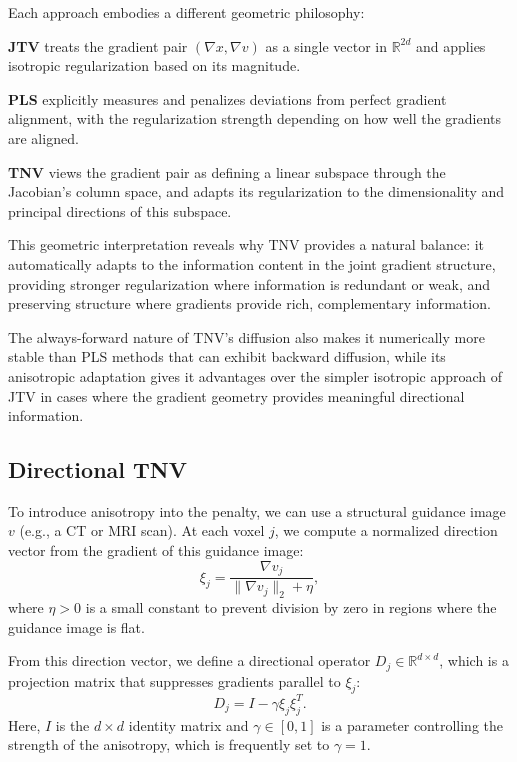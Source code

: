 Each approach embodies a different geometric philosophy:

\textbf{JTV} treats the gradient pair $(\nabla x, \nabla v)$ as a single vector in $\mathbb{R}^{2d}$ and applies isotropic regularization based on its magnitude.

\textbf{PLS} explicitly measures and penalizes deviations from perfect gradient alignment, with the regularization strength depending on how well the gradients are aligned.

\textbf{TNV} views the gradient pair as defining a linear subspace through the Jacobian's column space, and adapts its regularization to the dimensionality and principal directions of this subspace.

This geometric interpretation reveals why TNV provides a natural balance: it automatically adapts to the information content in the joint gradient structure, providing stronger regularization where information is redundant or weak, and preserving structure where gradients provide rich, complementary information.

The always-forward nature of TNV's diffusion also makes it numerically more stable than PLS methods that can exhibit backward diffusion, while its anisotropic adaptation gives it advantages over the simpler isotropic approach of JTV in cases where the gradient geometry provides meaningful directional information.



\subsection{Directional TNV}

To introduce anisotropy into the penalty, we can use a structural guidance image \(v\) (e.g., a CT or MRI scan). At each voxel \(j\), we compute a normalized direction vector from the gradient of this guidance image:
\[
    \xi_j = \frac{\nabla v_j}{\|\nabla v_j\|_2 + \eta},
\]
where \(\eta > 0\) is a small constant to prevent division by zero in regions where the guidance image is flat.

From this direction vector, we define a directional operator \(D_j \in \mathbb{R}^{d \times d}\), which is a projection matrix that suppresses gradients parallel to \(\xi_j\):
\[
    D_j = I - \gamma \xi_j \xi_j^T.
\]
Here, \(I\) is the \(d \times d\) identity matrix and \(\gamma \in [0,1]\) is a parameter controlling the strength of the anisotropy, which is frequently set to \(\gamma=1\).

